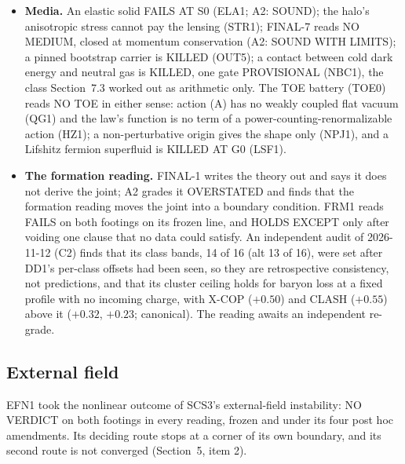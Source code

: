 \documentclass[10pt]{article}
\begin{document}
\begin{itemize}
\item \textbf{Media.} An elastic solid FAILS AT S0 (ELA1; A2: SOUND); the halo's anisotropic stress cannot pay the lensing (STR1); FINAL-7 reads NO MEDIUM, closed at momentum conservation (A2: SOUND WITH LIMITS); a pinned bootstrap carrier is KILLED (OUT5); a contact between cold dark energy and neutral gas is KILLED, one gate PROVISIONAL (NBC1), the class Section~7.3 worked out as arithmetic only. The TOE battery (TOE0) reads NO TOE in either sense: action (A) has no weakly coupled flat vacuum (QG1) and the law's function is no term of a power-counting-renormalizable action (HZ1); a non-perturbative origin gives the shape only (NPJ1), and a Lifshitz fermion superfluid is KILLED AT G0 (LSF1).
\item \textbf{The formation reading.} FINAL-1 writes the theory out and says it does not derive the joint; A2 grades it OVERSTATED and finds that the formation reading moves the joint into a boundary condition. FRM1 reads FAILS on both footings on its frozen line, and HOLDS EXCEPT only after voiding one clause that no data could satisfy. An independent audit of 2026-11-12 (C2) finds that its class bands, 14 of 16 (alt 13 of 16), were set after DD1's per-class offsets had been seen, so they are retrospective consistency, not predictions, and that its cluster ceiling holds for baryon loss at a fixed profile with no incoming charge, with X-COP ($+0.50$) and CLASH ($+0.55$) above it ($+0.32$, $+0.23$; canonical). The reading awaits an independent re-grade.
\end{itemize}

\subsection{External field}
EFN1 took the nonlinear outcome of SCS3's external-field instability: NO VERDICT on both footings in every reading, frozen and under its four post hoc amendments. Its deciding route stops at a corner of its own boundary, and its second route is not converged (Section~5, item 2).
\end{document}

